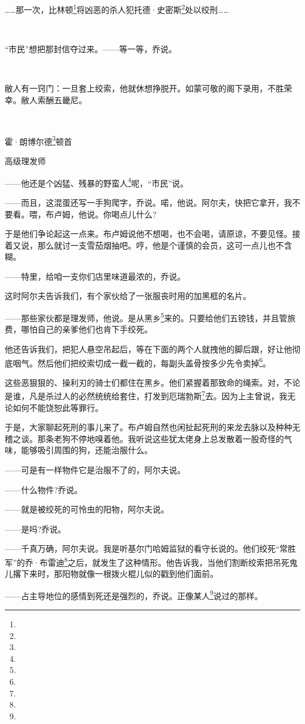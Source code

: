 \par ……那一次，比林顿\footnote{}将凶恶的杀人犯托德·史密斯\footnote{}处以绞刑……
\par  
\par “市民”想把那封信夺过来。——等一等，乔说。
\par  
\par 敝人有一窍门：一旦套上绞索，他就休想挣脱开。如蒙可敬的阁下录用，不胜荣幸。敝人索酬五畿尼。
\par  
\par 霍·朗博尔德\footnote{}顿首
\par 高级理发师
\par ——他还是个凶猛、残暴的野蛮人\footnote{}呢，“市民”说。
\par ——而且，这混蛋还写一手狗爬字，乔说。喏，他说。阿尔夫，快把它拿开，我不要看。喂，布卢姆，他说。你喝点儿什么?
\par 于是他们争论起这一点来。布卢姆说他不想喝，也不会喝，请原谅，不要见怪。接着又说，那么就讨一支雪茄烟抽吧。哼，他是个谨慎的会员，这可一点儿也不含糊。
\par ——特里，给咱一支你们店里味道最浓的，乔说。
\par 这时阿尔夫告诉我们，有个家伙给了一张服丧时用的加黑框的名片。
\par ——那些家伙都是理发师，他说。是从黑乡\footnote{}来的。只要给他们五镑钱，并且管旅费，哪怕自己的亲爹他们也肯下手绞死。
\par 他还告诉我们，把犯人悬空吊起后，等在下面的两个人就拽他的脚后跟，好让他彻底咽气。然后他们把绞索切成一截一截的，每副头盖骨按多少先令卖掉\footnote{}。
\par 这些恶狠狠的、操利刃的骑士们都住在黑乡。他们紧握着那致命的绳索。对，不论是谁，凡是杀过人的必然统统给套住，打发到厄瑞勃斯\footnote{}去。因为上主曾说，我无论如何不能饶恕此等罪行。
\par 于是，大家聊起死刑的事儿来了。布卢姆自然也闲扯起死刑的来龙去脉以及种种无稽之谈。那条老狗不停地嗅着他。我听说这些犹太佬身上总发散着一股奇怪的气味，能够吸引周围的狗，还能治服什么。
\par ——可是有一样物件它是治服不了的，阿尔夫说。
\par ——什么物件?乔说。
\par ——就是被绞死的可怜虫的阳物，阿尔夫说。
\par ——是吗?乔说。
\par ——千真万确，阿尔夫说。我是听基尔门哈姆监狱的看守长说的。他们绞死“常胜军”的乔·布雷迪\footnote{}之后，就发生了这种情形。他告诉我，当他们割断绞索把吊死鬼儿撂下来时，那阳物就像一根拨火棍儿似的戳到他们面前。
\par ——占主导地位的感情到死还是强烈的，乔说。正像某人\footnote{}说过的那样。
